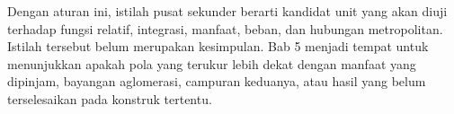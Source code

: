 \documentclass[11pt,a4paper,oneside,openany,indonesian]{report}
\begin{document}
Dengan aturan ini, istilah pusat sekunder berarti kandidat unit yang akan diuji terhadap fungsi relatif, integrasi, manfaat, beban, dan hubungan metropolitan. Istilah tersebut belum merupakan kesimpulan. Bab 5 menjadi tempat untuk menunjukkan apakah pola yang terukur lebih dekat dengan manfaat yang dipinjam, bayangan aglomerasi, campuran keduanya, atau hasil yang belum terselesaikan pada konstruk tertentu.

\printbibliography[heading=bibintoc,title={Daftar Pustaka}]
\end{document}

